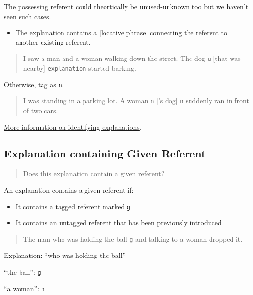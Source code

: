 \documentclass[
]{book}
\providecommand{\tightlist}{%
  \setlength{\itemsep}{0pt}\setlength{\parskip}{0pt}}
\begin{document}
The possessing referent could theortically be unused-unknown too but we haven't seen such cases.

\begin{itemize}
\tightlist
\item
  The explanation contains a {[}locative phrase{]}
  connecting the referent to another existing referent.
\end{itemize}

\begin{quote}
I saw a man and a woman walking down the street.
The dog \texttt{u} {[}that was nearby{]} \texttt{explanation} started barking.
\end{quote}

Otherwise, tag as \texttt{n}.

\begin{quote}
I was standing in a parking lot. A woman \texttt{n} {[}'s dog{]} \texttt{n} suddenly ran in front of two cars.
\end{quote}

\protect\hyperlink{referent-explanations}{More information on identifying explanations}.

\hypertarget{explanation-containing-given-referent}{%
\subsection{Explanation containing Given Referent}\label{explanation-containing-given-referent}}

\begin{quote}
Does this explanation contain a given referent?
\end{quote}

An explanation contains a given referent if:

\begin{itemize}
\tightlist
\item
  It contains a tagged referent marked \texttt{g}
\item
  It contains an untagged referent that has been previously introduced
\end{itemize}

\begin{quote}
The man who was holding the ball \texttt{g} and talking to a woman dropped it.
\end{quote}

Explanation: ``who was holding the ball''

``the ball'': \texttt{g}

``a woman'': \texttt{n}
\end{document}
